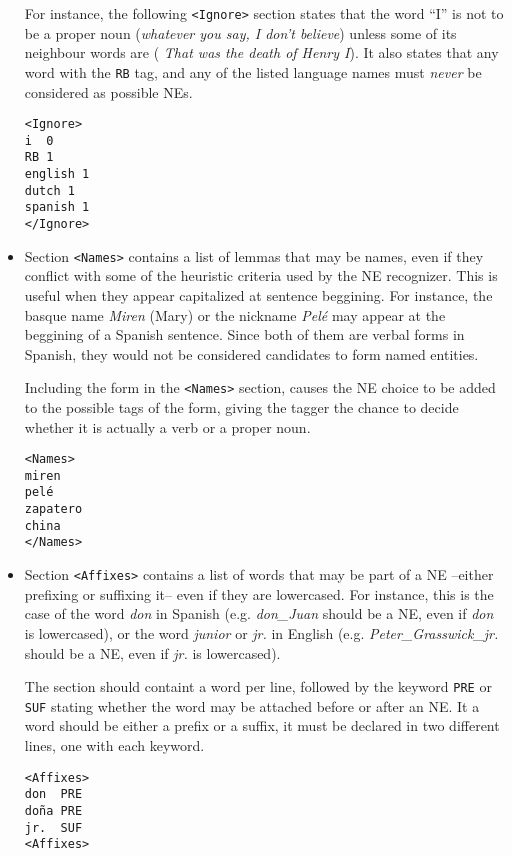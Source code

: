 \documentclass[a4paper]{book}
\begin{document}
\begin{itemize}
     For instance, the following \verb#<Ignore># section states that
     the word ``I'' is not to be a proper noun ({\em whatever you say,
       I don't believe}) unless some of its neighbour words are ({\em
       That was the death of Henry I}). It also states that any word
     with the {\tt RB} tag, and any of the listed language names must
     {\sl never} be considered as possible NEs.
\begin{verbatim}
<Ignore>
i  0
RB 1
english 1
dutch 1
spanish 1
</Ignore>
\end{verbatim}

  \item Section \verb#<Names># contains a list of lemmas that may be
    names, even if they conflict with some of the heuristic criteria
    used by the NE recognizer. This is useful when they appear
    capitalized at sentence beggining. For instance, the basque name
    {\em Miren} (Mary) or the nickname {\em Pel\'e} may appear at the
    beggining of a Spanish sentence. Since both of them are verbal
    forms in Spanish, they would not be considered candidates to form
    named entities.
 
   Including the form in the \verb#<Names># section, causes the NE
   choice to be added to the possible tags of the form, giving the
   tagger the chance to decide whether it is actually a verb or a
   proper noun.
\begin{verbatim}
<Names>
miren
pelé
zapatero
china
</Names>
\end{verbatim}

  \item Section \verb#<Affixes># contains a list of words that may be
    part of a NE --either prefixing or suffixing it-- even if they are
    lowercased.  For instance, this is the case of the word {\sl don}
    in Spanish (e.g. {\sl don\_Juan} should be a NE, even if {\sl don}
    is lowercased), or the word {\sl junior} or {\sl jr.} in English
    (e.g. {\sl Peter\_Grasswick\_jr.} should be a NE, even if {\sl
      jr.} is lowercased).
 
  The section should containt a word per line, followed by the keyword
  {\tt PRE} or {\tt SUF} stating whether the word may be attached
  before or after an NE. It a word should be either a prefix or a
  suffix, it must be declared in two different lines, one with each
  keyword.
\begin{verbatim}
<Affixes>
don  PRE
doña PRE
jr.  SUF
<Affixes>
\end{verbatim}


\end{itemize}
\end{document}
